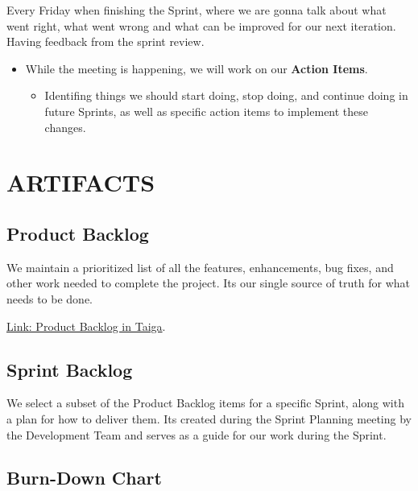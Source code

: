 \documentclass{article}
\providecommand{\tightlist}{
  \setlength{\itemsep}{0pt}\setlength{\parskip}{0pt}}
\begin{document}
Every Friday when finishing the Sprint, where we are gonna talk about
what went right, what went wrong and what can be improved for our next
iteration. Having feedback from the sprint review.

\begin{itemize}
\tightlist
\item
  While the meeting is happening, we will work on our \textbf{Action
  Items}.

  \begin{itemize}
  \tightlist
  \item
    Identifing things we should start doing, stop doing, and continue
    doing in future Sprints, as well as specific action items to
    implement these changes.
  \end{itemize}
\end{itemize}

\newpage

\hypertarget{artifacts}{
\section{ARTIFACTS}\label{artifacts}}

\hypertarget{productbacklog}{
\subsection{\texorpdfstring{\textbf{Product
Backlog}}{Product Backlog}}\label{productbacklog}}

We maintain a prioritized list of all the features, enhancements, bug
fixes, and other work needed to complete the project.
It\textquotesingle s our single source of truth for what needs to be
done.

\href{https://tree.taiga.io/project/joseluis-teran-coffeetime/backlog}{Link: Product Backlog in Taiga}.

\hypertarget{sprintbacklog}{
\subsection{\texorpdfstring{\textbf{Sprint
Backlog}}{Sprint Backlog}}\label{sprintbacklog}}

We select a subset of the Product Backlog items for a specific Sprint,
along with a plan for how to deliver them. It\textquotesingle s created
during the Sprint Planning meeting by the Development Team and serves as
a guide for our work during the Sprint.

\hypertarget{burndownchart}{
\subsection{\texorpdfstring{\textbf{Burn-Down
Chart}}{Burn-Down Chart}}\label{burndownchart}}
\end{document}
